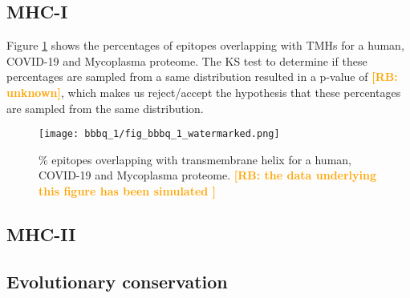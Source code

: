 \documentclass{article}
\newcommand{\richel}[1]{\textcolor{orange}{\textbf{[RB: #1]}}}
\begin{document}
\subsection{MHC-I}

Figure \ref{fig:1} shows the percentages of epitopes overlapping 
with TMHs for a human, COVID-19 and Mycoplasma proteome.
The KS test to determine if these percentages are sampled from
a same distribution resulted in a p-value of \richel{unknown},
which makes us reject/accept the hypothesis that these percentages
are sampled from the same distribution. 

\begin{figure}[!htbp]
  \texttt{[image: bbbq\_1/fig\_bbbq\_1\_watermarked.png]}
  \caption{
    \% epitopes overlapping with transmembrane helix
    for a human, COVID-19 and Mycoplasma proteome.
    \richel{
      the data underlying this figure has been simulated
    }
  }
  \label{fig:1}
\end{figure}



\subsection{MHC-II}

\subsection{Evolutionary conservation}




\end{document}
